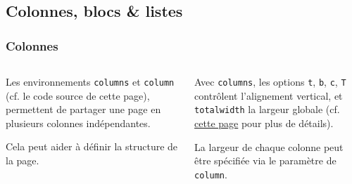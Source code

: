 \documentclass[10pt,    %
    french,             %
    xcolor=table,       %
    envcountsect,       %
    aspectratio=43      %
]{beamer}
\begin{document}
\subsection{Colonnes, blocs \& listes}
\begin{frame}
    \frametitle{Colonnes}
    
    \begin{columns}[T,totalwidth=\textwidth] %
        \begin{column}{0.33\textwidth}
            Les environnements \texttt{columns} et \texttt{column} (cf. le code source de cette page), permettent de partager une page en plusieurs colonnes indépendantes. 
            
            Cela peut aider à définir la structure de la page.
        \end{column}
        
        \begin{column}{0.33\textwidth}
            Avec \texttt{columns}, les options \texttt{t}, \texttt{b}, \texttt{c}, \texttt{T} contrôlent l'alignement vertical, et \texttt{totalwidth} la largeur globale (cf. \href{https://tex.stackexchange.com/a/51509/31360}{cette page} pour plus de détails).
            
            La largeur de chaque colonne peut être spécifiée via le paramètre de \texttt{column}.
        \end{column}
        

\end{columns}
\end{frame}
\end{document}
